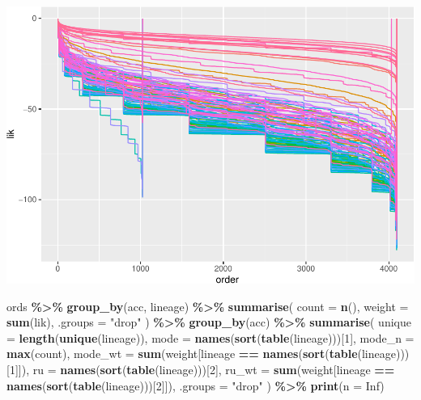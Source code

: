 \documentclass[
]{article}
\newenvironment{Shaded}{\begin{snugshade}}{\end{snugshade}}
\newcommand{\DataTypeTok}[1]{\textcolor[rgb]{0.13,0.29,0.53}{#1}}
\newcommand{\DecValTok}[1]{\textcolor[rgb]{0.00,0.00,0.81}{#1}}
\newcommand{\KeywordTok}[1]{\textcolor[rgb]{0.13,0.29,0.53}{\textbf{#1}}}
\newcommand{\NormalTok}[1]{#1}
\newcommand{\OperatorTok}[1]{\textcolor[rgb]{0.81,0.36,0.00}{\textbf{#1}}}
\newcommand{\OtherTok}[1]{\textcolor[rgb]{0.56,0.35,0.01}{#1}}
\newcommand{\StringTok}[1]{\textcolor[rgb]{0.31,0.60,0.02}{#1}}
\begin{document}
\includegraphics{ord-results_files/figure-latex/change_in_weight-1.pdf}

\begin{Shaded}
\begin{Highlighting}[]
\NormalTok{ords }\OperatorTok{\%\textgreater{}\%}
\StringTok{    }\KeywordTok{group\_by}\NormalTok{(acc, lineage) }\OperatorTok{\%\textgreater{}\%}
\StringTok{    }\KeywordTok{summarise}\NormalTok{(}
        \DataTypeTok{count =} \KeywordTok{n}\NormalTok{(),}
        \DataTypeTok{weight =} \KeywordTok{sum}\NormalTok{(lik),}
        \DataTypeTok{.groups =} \StringTok{"drop"}
\NormalTok{    ) }\OperatorTok{\%\textgreater{}\%}
\StringTok{    }\KeywordTok{group\_by}\NormalTok{(acc) }\OperatorTok{\%\textgreater{}\%}
\StringTok{    }\KeywordTok{summarise}\NormalTok{(}
        \DataTypeTok{unique =} \KeywordTok{length}\NormalTok{(}\KeywordTok{unique}\NormalTok{(lineage)),}
        \DataTypeTok{mode =} \KeywordTok{names}\NormalTok{(}\KeywordTok{sort}\NormalTok{(}\KeywordTok{table}\NormalTok{(lineage)))[}\DecValTok{1}\NormalTok{],}
        \DataTypeTok{mode\_n =} \KeywordTok{max}\NormalTok{(count),}
        \DataTypeTok{mode\_wt =} \KeywordTok{sum}\NormalTok{(weight[lineage }\OperatorTok{==}
\StringTok{            }\KeywordTok{names}\NormalTok{(}\KeywordTok{sort}\NormalTok{(}\KeywordTok{table}\NormalTok{(lineage)))[}\DecValTok{1}\NormalTok{]]),}
        \DataTypeTok{ru =} \KeywordTok{names}\NormalTok{(}\KeywordTok{sort}\NormalTok{(}\KeywordTok{table}\NormalTok{(lineage)))[}\DecValTok{2}\NormalTok{],}
        \DataTypeTok{ru\_wt =} \KeywordTok{sum}\NormalTok{(weight[lineage }\OperatorTok{==}
\StringTok{            }\KeywordTok{names}\NormalTok{(}\KeywordTok{sort}\NormalTok{(}\KeywordTok{table}\NormalTok{(lineage)))[}\DecValTok{2}\NormalTok{]]),}
        \DataTypeTok{.groups =} \StringTok{"drop"}
\NormalTok{    ) }\OperatorTok{\%\textgreater{}\%}
\StringTok{    }\KeywordTok{print}\NormalTok{(}\DataTypeTok{n =} \OtherTok{Inf}\NormalTok{)}
\end{Highlighting}
\end{Shaded}
\end{document}
